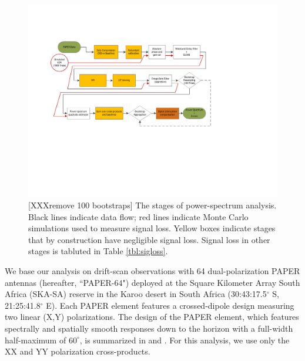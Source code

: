 \documentclass[twocolumn,numberedappendix]{emulateapj} \shorttitle{New Limits on the 21 cm Power Spectrum at $z=8.4$}
\begin{document}
\begin{figure}
\includegraphics[width=2\columnwidth,trim=0cm 7cm 5cm 2cm,clip]{plots/data_flow_chart.pdf}
\caption
{
[XXXremove 100 bootstraps]
The stages of power-spectrum analysis. Black lines indicate data flow; red lines indicate
Monte Carlo simulations used to 
measure signal loss. Yellow boxes indicate stages that by construction have negligible signal loss.
Signal loss in other stages is tabluted in Table \ref{tbl:sigloss}.
}
\label{fig:flowchart}
\end{figure}

We base our analysis on drift-scan observations 
with 64 dual-polarization PAPER antennas (hereafter, ``PAPER-64") deployed 
at the Square Kilometer Array South Africa
(SKA-SA) reserve in the Karoo desert in South Africa
(30:43:17.5$^\circ$ S, 21:25:41.8$^\circ$ E).
Each PAPER element features a crossed-dipole design measuring two
linear (X,Y) polarizations.
The design of the PAPER element, 
which features spectrally and spatially smooth responses 
down to the horizon with a full-width half-maximum of $60^{\circ}$, is summarized in \citet{parsons_et_al2010}
and \citet{pober_et_al2012}.  
For this analysis, we use only the XX and YY polarization cross-products.
\end{document}
